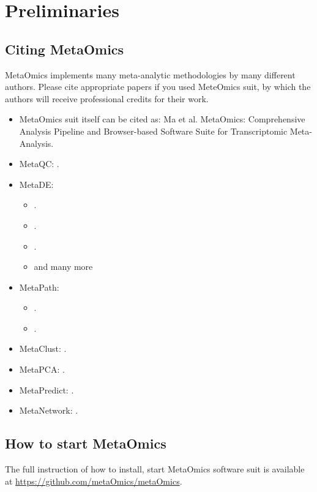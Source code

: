 \section{Preliminaries}
\subsection{Citing MetaOmics}
MetaOmics implements many meta-analytic methodologies by many different authors. 
Please cite appropriate papers if you used MeteOmics suit,
by which the authors will receive professional credits for their work.

\begin{itemize}
\item MetaOmics suit itself can be cited as: Ma et al. MetaOmics: Comprehensive Analysis Pipeline and Browser-based Software Suite for Transcriptomic Meta-Analysis.
\item MetaQC: .
\item MetaDE: 
\begin{itemize}
\item {}.
\item {}.
\item {}.
\item and many more
\end{itemize}
\item MetaPath: 
\begin{itemize}
\item {}.
\item {}.
\end{itemize}
\item MetaClust: .
\item MetaPCA: .
\item MetaPredict: .
\item MetaNetwork: .
\end{itemize}



\subsection{How to start MetaOmics}

The full instruction of how to install, start MetaOmics software suit is available at \url{https://github.com/metaOmics/metaOmics}.



